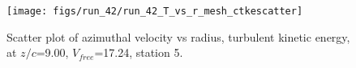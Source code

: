 \begin{figure}[H]
\centering
\texttt{[image: figs/run\_42/run\_42\_T\_vs\_r\_mesh\_ctkescatter]}
\caption{Scatter plot of azimuthal velocity vs radius, turbulent kinetic energy, at $z/c$=9.00, $V_{free}$=17.24, station 5.}
\label{fig:run_42_T_vs_r_mesh_ctkescatter}
\end{figure}


